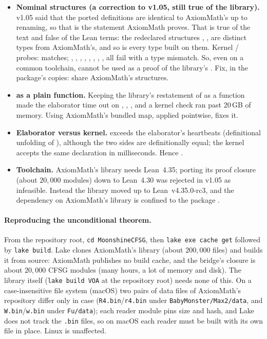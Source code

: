 \begin{warning}[title={Dead ends met while discharging the hypothesis}]
\begin{itemize}
\item \textbf{Nominal structures (a correction to v1.05, still true of the library).}  v1.05 said that the ported definitions are identical to
  AxiomMath's up to renaming, so that  is the statement AxiomMath proves.  That is true of the text and false
  of the Lean terms: the redeclared structures , ,  are distinct types from AxiomMath's,
  and so is every type built on them.  Kernel / probes:  matches;
  , , , , , ,
  , ,  all fail with a type mismatch.  So, even on a common toolchain,
   cannot be used as a proof of the library's .  Fix, in the package's copies: share
  AxiomMath's structures.
\item \textbf{ as a plain function.}  Keeping the library's restatement of  as a function made the elaborator
  time out on , , , and a kernel check ran past 20\,GB of memory.  Using AxiomMath's bundled map,
  applied pointwise, fixes it.
\item \textbf{Elaborator versus kernel.}   exceeds the elaborator's heartbeats
  (definitional unfolding of ), although the two sides are definitionally equal; the kernel accepts the same
  declaration in milliseconds.  Hence .
\item \textbf{Toolchain.}  AxiomMath's library needs Lean~4.35; porting its proof closure (about $20{,}000$ modules) down to
  Lean~4.30 was rejected in v1.05 as infeasible.  Instead the library moved up to Lean~v4.35.0-rc3, and the dependency on
  AxiomMath's library is confined to the package .
\end{itemize}
\end{warning}

\paragraph{Reproducing the unconditional theorem.}  From the repository root, \texttt{cd MoonshineCFSG}, then
\texttt{lake exe cache get} followed by \texttt{lake build}.  Lake clones AxiomMath's library (about $200{,}000$ files) and
builds it from source: AxiomMath publishes no build cache, and the bridge's closure is about $20{,}000$ CFSG modules (many
hours, a lot of memory and disk).  The library itself (\texttt{lake build VOA} at the repository root) needs none of this.
On a case-insensitive file system (macOS) two pairs of data files of
AxiomMath's repository differ only in case (\texttt{R4.bin}/\texttt{r4.bin} under \texttt{BabyMonster/Max2/data}, and
\texttt{W.bin}/\texttt{w.bin} under \texttt{Fu/data}); each reader module pins size and hash, and Lake does not track the
\texttt{.bin} files, so on macOS each reader must be built with its own file in place.  Linux is unaffected.


